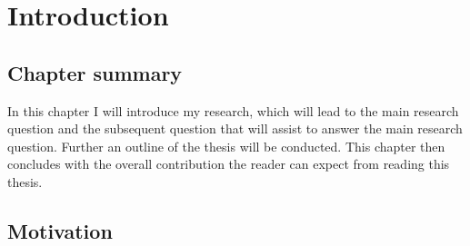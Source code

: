 \chapter{Introduction}

\label{chapterlabel1}

\section*{Chapter summary}

In this chapter I will introduce my research, which will lead to the main research question and the subsequent question that will assist to answer the main research question. Further an outline of the thesis will be conducted. This chapter then concludes with the overall contribution the reader can expect from reading this thesis.\newpage

\section{Motivation}

